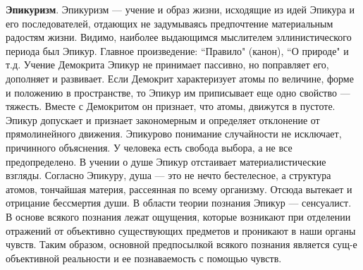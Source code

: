 \documentclass[12pt]{article}
\begin{document}
\textbf{Эпикуризм}. Эпикуризм --- учение и образ жизни, исходящие из идей Эпикура и
его последователей, отдающих не
задумываясь  предпочтение  материальным радостям  жизни.  Видимо,  наиболее  выдающимся  мыслителем
эллинистического периода был Эпикур. Главное произведение: ``Правило" (канон),
``О природе" и т.д. Учение Демокрита
Эпикур не принимает пассивно, но поправляет его, дополняет и развивает. Если Демокрит характеризует
атомы по
величине, форме и положению в пространстве, то Эпикур им приписывает еще одно свойство ---
тяжесть. Вместе с
Демокритом он признает, что атомы, движутся в пустоте. Эпикур допускает и признает закономерным и
определяет
отклонение  от  прямолинейного движения.  Эпикурово  понимание  случайности  не  исключает,  причинного
объяснения.  У  человека  есть  свобода  выбора,  а  не  все  предопределено.  В  учении  о  душе  Эпикур  отстаивает
материалистические взгляды.
Согласно Эпикуру, душа --- это не нечто бестелесное, а структура атомов, тончайшая
материя, рассеянная по всему организму. Отсюда вытекает и отрицание бессмертия души. В области теории
познания Эпикур --- сенсуалист. В основе всякого познания лежат ощущения, которые возникают при отделении
отражений  от  объективно существующих  предметов  и  проникают  в  наши  органы  чувств.  Таким  образом,
основной  предпосылкой  всякого  познания  является  сущ-е
объективной  реальности  и  ее  познаваемость  с помощью чувств. 
\end{document}
